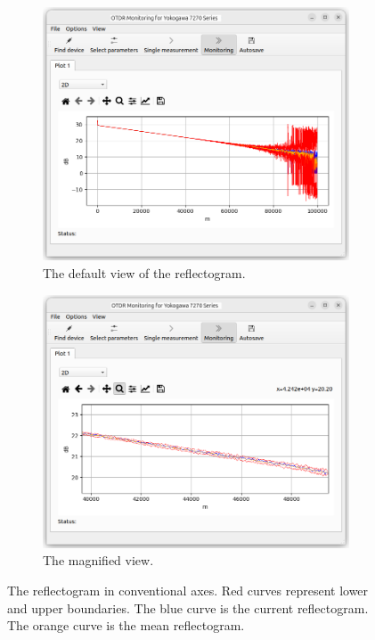 \begin{figure}
	\begin{subfigure}[b]{0.5\textwidth}
		\centering
		\includegraphics{pictures/averager2d.png}
		\caption{The default view of the reflectogram.}
	\end{subfigure}
	\hfill
	\begin{subfigure}[b]{0.5\textwidth}
		\centering
		\includegraphics{pictures/averager2d_zoom.png}
		\caption{The magnified view.}
	\end{subfigure}

	\caption{The reflectogram in conventional axes. Red curves represent lower and upper boundaries. The blue curve is the current reflectogram. The orange curve is the mean reflectogram.}
\end{figure}



